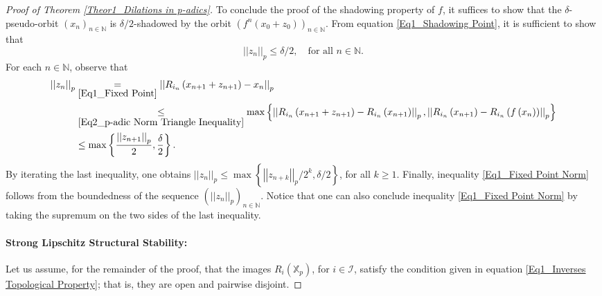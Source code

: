 \documentclass[a4paper, 12pt]{article}
\theoremstyle{definition}
\begin{document}
\begin{proof}[Proof of Theorem \ref{Theor1_Dilations in p-adics}]
		To conclude the proof of the shadowing property of $f$, it suffices to show that the $\delta$-pseudo-orbit $ \left(  x_{n}   \right)_{n \in \mathbb{N} }$ is $\delta/2$-shadowed by the orbit $ \left(  f^{n} \left(  x_{0} + z_{0}  \right)    \right)_{n \in \mathbb{N} }$. 
		From equation \eqref{Eq1_Shadowing Point}, it is sufficient to show that 
		\begin{equation}\label{Eq1_Fixed Point Norm}
			\left| \left|  z_{n}  \right|  \right|_{p}   \le   \delta/2, \quad \text{for all }  n \in  \mathbb{N} . 
		\end{equation}
		For each $n \in \mathbb{N} $, observe that 
		\begin{align*}
			\left| \left|  z_{n}  \right|  \right|_{p}   & \underset{\eqref{Eq1_Fixed Point}}{=}    \left| \left|  R_{i_{n}} \left(  x_{n+1} +z_{n+1}  \right)  - x_{n}  \right|  \right|_{p}  \\ 
			& \underset{\eqref{Eq2_p-adic Norm Triangle Inequality}}{\le}   \max  \left\{    \left| \left|  R_{i_{n}} \left(  x_{n+1} + z_{n+1}  \right)  - R_{i_{n}} \left(  x_{n+1}  \right)   \right|  \right|_{p} ,  \left| \left|  R_{i_{n}} \left(  x_{n+1}  \right)  - R_{i_{n}}  \left(  f  \left(  x_{n}  \right)   \right)   \right|  \right|_{p}  \right\}   \\ 
			& \le   \max \left\{  { \left| \left|  z_{n+1} \right|  \right|_{p} \over 2} ,   {\delta \over 2}  \right\}  .
		\end{align*}
		By iterating the last inequality, one obtains $ \left| \left|  z_{n}  \right|  \right|_{p} \le \max \left\{   \left| \left|  z_{n+k}  \right|  \right|_{p}/2^{k}, \delta/2  \right\} $, for all $k \ge 1$. Finally, inequality \eqref{Eq1_Fixed Point Norm} follows from the boundedness of the sequence $ \left(   \left| \left|  z_{n}  \right|  \right|_{p}   \right)_{n \in \mathbb{N} }$. Notice that one can also conclude inequality \eqref{Eq1_Fixed Point Norm} by taking the supremum on the two sides of the last inequality. 
		
		
		
		
		
		\paragraph{Strong Lipschitz Structural Stability:}
		
		Let us assume, for the remainder of the proof, that the images $R_{i} \left(  \mathbb{X}_{p}  \right) $, for $i \in \mathcal{I}$, satisfy the condition given in equation \eqref{Eq1_Inverses Topological Property}; that is, they are open and pairwise disjoint.
		

\end{proof}
\end{document}
